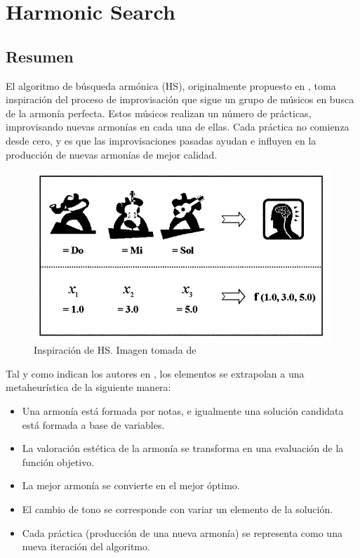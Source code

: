 \section{Harmonic Search}

\subsection{Resumen}

El algoritmo de búsqueda armónica (HS), originalmente propuesto en \cite{hs1}, toma inspiración del proceso de improvisación que sigue un grupo de músicos en busca de la armonía perfecta.
Estos músicos realizan un número de prácticas, improvisando nuevas armonías en cada una de ellas. Cada práctica no comienza desde cero, y es que las improvisaciones pasadas ayudan e influyen en la producción de nuevas armonías de mejor calidad.

\vspace{\baselineskip}

\begin{figure}[H]
    \centering
    \includegraphics[width=0.55\linewidth]{img/a.png}
    \caption{Inspiración de HS. Imagen tomada de \cite{hs1}}
    \label{a}
\end{figure}

\vspace{\baselineskip}

Tal y como indican los autores en \cite{hs2}, los elementos se extrapolan a una metaheurística de la siguiente manera:
\begin{itemize}
    \item Una armonía está formada por notas, e igualmente una solución candidata está formada a base de variables.
    \item La valoración estética de la armonía se transforma en una evaluación de la función objetivo.
    \item La mejor armonía se convierte en el mejor óptimo.
    \item El cambio de tono se corresponde con variar un elemento de la solución.
    \item Cada práctica (producción de una nueva armonía) se representa como una nueva iteración del algoritmo.
\end{itemize}

